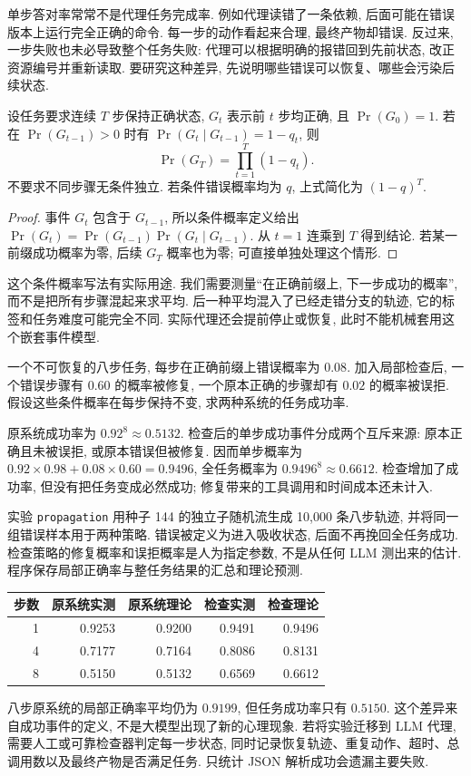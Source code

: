 单步答对率常常不是代理任务完成率. 例如代理读错了一条依赖, 后面可能在错误版本上运行完全正确的命令. 每一步的动作看起来合理, 最终产物却错误. 反过来, 一步失败也未必导致整个任务失败: 代理可以根据明确的报错回到先前状态, 改正资源编号并重新读取. 要研究这种差异, 先说明哪些错误可以恢复、哪些会污染后续状态.

\begin{proposition}
设任务要求连续 $T$ 步保持正确状态, $G_t$ 表示前 $t$ 步均正确, 且 $\Pr(G_0)=1$. 若在 $\Pr(G_{t-1})>0$ 时有 $\Pr(G_t\mid G_{t-1})=1-q_t$, 则
\[
\Pr(G_T)=\prod_{t=1}^T(1-q_t).
\]
不要求不同步骤无条件独立. 若条件错误概率均为 $q$, 上式简化为 $(1-q)^T$.
\end{proposition}
\begin{proof}
事件 $G_t$ 包含于 $G_{t-1}$, 所以条件概率定义给出 $\Pr(G_t)=\Pr(G_{t-1})\Pr(G_t\mid G_{t-1})$. 从 $t=1$ 连乘到 $T$ 得到结论. 若某一前缀成功概率为零, 后续 $G_T$ 概率也为零; 可直接单独处理这个情形.
\end{proof}
这个条件概率写法有实际用途. 我们需要测量“在正确前缀上, 下一步成功的概率”, 而不是把所有步骤混起来求平均. 后一种平均混入了已经走错分支的轨迹, 它的标签和任务难度可能完全不同. 实际代理还会提前停止或恢复, 此时不能机械套用这个嵌套事件模型.

\begin{example}
一个不可恢复的八步任务, 每步在正确前缀上错误概率为 $0.08$. 加入局部检查后, 一个错误步骤有 $0.60$ 的概率被修复, 一个原本正确的步骤却有 $0.02$ 的概率被误拒. 假设这些条件概率在每步保持不变, 求两种系统的任务成功率.
\end{example}
\begin{solution}
原系统成功率为 $0.92^8\approx0.5132$. 检查后的单步成功事件分成两个互斥来源: 原本正确且未被误拒, 或原本错误但被修复. 因而单步概率为 $0.92\times0.98+0.08\times0.60=0.9496$, 全任务概率为 $0.9496^8\approx0.6612$. 检查增加了成功率, 但没有把任务变成必然成功; 修复带来的工具调用和时间成本还未计入.
\end{solution}

实验 \texttt{propagation} 用种子 144 的独立子随机流生成 10,000 条八步轨迹, 并将同一组错误样本用于两种策略. 错误被定义为进入吸收状态, 后面不再挽回全任务成功. 检查策略的修复概率和误拒概率是人为指定参数, 不是从任何 LLM 测出来的估计. 程序保存局部正确率与整任务结果的汇总和理论预测.
\begin{center}
\begin{tabular}{rrrrr}\toprule
步数 & 原系统实测 & 原系统理论 & 检查实测 & 检查理论\\\midrule
1 & 0.9253 & 0.9200 & 0.9491 & 0.9496\\
4 & 0.7177 & 0.7164 & 0.8086 & 0.8131\\
8 & 0.5150 & 0.5132 & 0.6569 & 0.6612\\\bottomrule
\end{tabular}
\end{center}
八步原系统的局部正确率平均仍为 $0.9199$, 但任务成功率只有 $0.5150$. 这个差异来自成功事件的定义, 不是大模型出现了新的心理现象. 若将实验迁移到 LLM 代理, 需要人工或可靠检查器判定每一步状态, 同时记录恢复轨迹、重复动作、超时、总调用数以及最终产物是否满足任务. 只统计 JSON 解析成功会遗漏主要失败.

